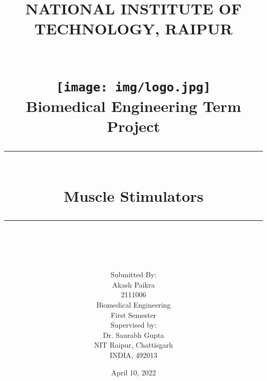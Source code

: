 \documentclass[11pt]{article}
\newcommand{\HRule}[1]{\rule{\linewidth}{#1}}
\begin{document}
\title{ \LARGE NATIONAL INSTITUTE OF TECHNOLOGY, RAIPUR
		\\\\\\[1.0cm]
		\texttt{[image: img/logo.jpg]}\\[.5cm]
		Biomedical Engineering Term Project\\
		\HRule{2pt} \\
		\LARGE \textbf{Muscle Stimulators } %
		\HRule{2pt} \\ [0.5cm]
		\normalsize \vspace*{5\baselineskip}}

\author{
        Submitted By:\\
		Akash Paikra\\ 
		2111006\\
		Biomedical Engineering\\
		First Semester\\[1cm]
		 Supervised by:        \\
		Dr. Saurabh Gupta \\
		NIT Raipur, Chattisgarh\\
		INDIA, 492013
		 }
\date{April 10, 2022}		 
		 
\maketitle

\newpage

\tableofcontents
\newpage

\newpage

\section*{}
\section*{}
\end{document}
